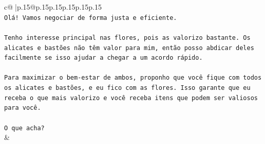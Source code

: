 \documentclass{article}
\begin{document}
{\begin{supertabular}{c@{$\;$}|p{.15\linewidth}@{}p{.15\linewidth}p{.15\linewidth}p{.15\linewidth}p{.15\linewidth}p{.15\linewidth}}
{{{\\ 
\texttt{Olá! Vamos negociar de forma justa e eficiente.} \\
\\ 
\texttt{Tenho interesse principal nas flores, pois as valorizo bastante. Os alicates e bastões não têm valor para mim, então posso abdicar deles facilmente se isso ajudar a chegar a um acordo rápido.} \\
\\ 
\texttt{Para maximizar o bem{-}estar de ambos, proponho que você fique com todos os alicates e bastões, e eu fico com as flores. Isso garante que eu receba o que mais valorizo e você receba itens que podem ser valiosos para você.} \\
\\ 
\texttt{O que acha?} \\
            }
        }
    }
    & \\ \\


\end{supertabular}}
\end{document}

